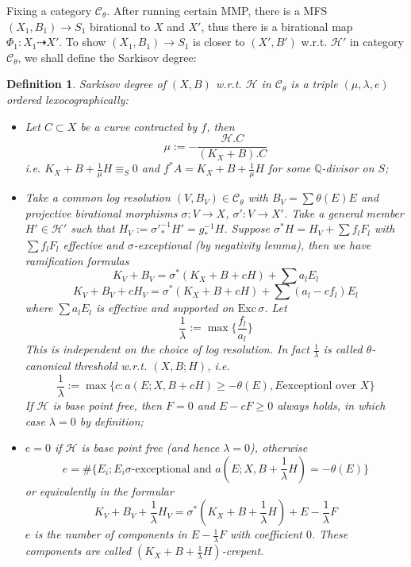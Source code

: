 \documentclass{article}
\newtheorem{defn}{Definition}[section]
\begin{document}
Fixing a category $ \mathcal{C}_\theta $. After running certain MMP, there is  a MFS $ (X_1,B_1)\to S_1$ birational to $ X $ and $ X' $, thus there is a birational map $ \Phi_1:X_1\dashrightarrow X' $. To show $ (X_1,B_1)\to S_1 $ is closer to $ (X',B') $ w.r.t. $ \mathcal{H}' $ in category $ \mathcal{C}_\theta $, we shall define the Sarkisov degree:
\begin{defn}\label{def}
Sarkisov degree of $ (X,B) $ w.r.t. $ \mathcal{H} $ in $ \mathcal{C}_\theta $ is a triple $ (\mu,\lambda,e) $ ordered lexocographically:
\begin{itemize}
\item Let $ C\subset X  $ be a curve contracted by $ f $, then 
$$ \mu:=-\frac{\mathcal{H}.C}{(K_X+B).C} $$
i.e. $ K_X+B+\frac{1}{\mu} H \equiv_S0$ and $ f^*A=K_X+B+\frac{1}{\mu} H $ for some $ \mathbb{Q} $-divisor on $ S $;
\item Take a common log resolution  $ (V,B_V)\in \mathcal{C}_\theta $ with $ B_V=\sum \theta(E)E $ and projective birational morphisms $ \sigma:V\to X $, $ \sigma':V\to X' $. Take a general member $ H'\in \mathcal{H}' $ such that $ H_V:=\sigma'^{-1}_*H'=g^{-1}_*H $. Suppose $ \sigma^*H=H_V+\sum f_lF_l $ with $ \sum f_lF_l $ effective and $ \sigma $-exceptional (by negativity lemma), then we have ramification formulas
$$ K_V+B_V=\sigma^*(K_X+B+cH)+\sum a_lE_l  $$
$$ K_V+B_V+cH_V=\sigma^*(K_X+B+cH)+\sum(a_l-cf_l)E_l $$
where $ \sum a_lE_l $ is effective and supported on $ \mathrm{Exc}\,\sigma $.   Let
$$ \frac{1}{\lambda}:=\max\{ \frac{f_l}{a_l}\} $$
This is independent on the choice of log resolution. In fact $ \frac{1}{\lambda} $ is called $ \theta $-canonical threshold w.r.t. $ (X,B;H) $, i.e.
$$ \frac{1}{\lambda}:=\max\{c:a(E;X,B+cH)\geqslant-\theta(E) ,E\text{exceptionl over }X \}$$ 
If $ \mathcal{H} $ is base point free, then $ F=0 $ and $ E-cF\geqslant 0  $ always holds, in which case $ \lambda=0 $ by definition;
\item $ e=0 $ if $ \mathcal{H} $ is base point free (and hence $ \lambda=0 $), otherwise 
$$ e=\#\{E_i; E_i \sigma\text{-exceptional and } a(E;X,B+\frac{1}{\lambda} H)=-\theta(E) \} $$
or equivalently in the formular 
$$ K_V+B_V+\frac{1}{\lambda} H_V=\sigma^*(K_X+B+\frac{1}{\lambda} H)+E-\frac{1}{\lambda} F $$
$ e $ is the number of components in $ E-\frac{1}{\lambda} F $ with coefficient $ 0 $. These components are called $ (K_X+B+\frac{1}{\lambda} H) $-crepent. 
\end{itemize}
\end{defn}
\end{document}
